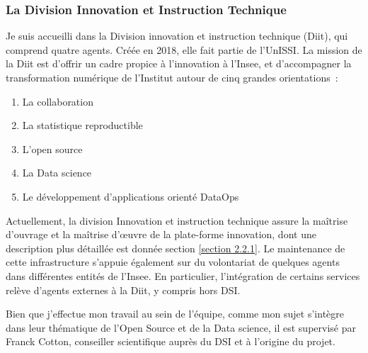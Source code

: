 \subsubsection{La Division Innovation et Instruction Technique}
Je suis accueilli dans la Division innovation et instruction technique (Diit), qui comprend quatre agents. Créée en 2018, elle fait partie de l'UnISSI. La mission de la Diit est d'offrir un cadre propice à l'innovation à l'Insee, et d'accompagner la transformation numérique de l'Institut autour de cinq grandes orientations~:
\begin{enumerate}
    \item La collaboration
    \item La statistique reproductible
    \item L'open source 
    \item La Data science
    \item Le développement d'applications orienté DataOps
    \newline
\end{enumerate}

Actuellement, la division Innovation et instruction technique assure la maîtrise d’ouvrage et la maîtrise d’œuvre de la plate-forme innovation, dont une description plus détaillée est donnée section \ref{section 2.2.1}. Le maintenance de cette infrastructure s’appuie également sur du volontariat de quelques agents dans différentes entités de l’Insee. En particulier, l’intégration de certains services relève d’agents externes à la Diit, y compris hors DSI. 
\newline

Bien que j'effectue mon travail au sein de l'équipe, comme mon sujet s'intègre dans leur thématique de l'Open Source et de la Data science, il est supervisé par Franck Cotton, conseiller scientifique auprès du DSI et à l'origine du projet. 
\newline

